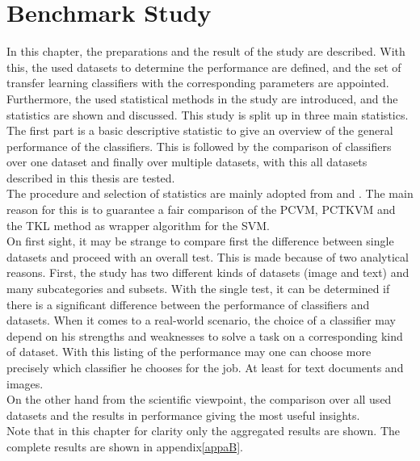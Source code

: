 \chapter{Benchmark Study}\label{EmChap}
In this chapter, the preparations and the result of the study are described.
With this, the used datasets to determine the performance are defined, and the set of transfer learning classifiers with the corresponding parameters are appointed.\\
Furthermore, the used statistical methods in the study are introduced, and the statistics are shown and discussed.
This study is split up in three main statistics.
The first part is a basic descriptive statistic to give an overview of the general performance of the classifiers.
This is followed by the comparison of classifiers over one dataset and finally over multiple datasets, with this all datasets described in this thesis are tested.\\
The procedure and selection of statistics are mainly adopted from \cite{Chen.2009} and \cite{Long.2015}.
The main reason for this is to guarantee a fair comparison of the \acs{PCVM}, \acs{PCTKVM} and the \acs{TKL} method as wrapper algorithm for the \acs{SVM}.\\
On first sight, it may be strange to compare first the difference between single datasets and proceed with an overall test.
This is made because of two analytical reasons. First, the study has two different kinds of datasets (image and text) and many subcategories and subsets.
With the single test, it can be determined if there is a significant difference between the performance of classifiers and datasets.
When it comes to a real-world scenario, the choice of a classifier may depend on his strengths and weaknesses to solve a task on a corresponding kind of dataset.
With this listing of the performance may one can choose more precisely which classifier he chooses for the job. At least for text documents and images.\\
On the other hand from the scientific viewpoint, the comparison over all used datasets and the results in performance giving the most useful insights.\\
Note that in this chapter for clarity only the aggregated results are shown. The complete results are shown in appendix\ref{appaB}.\\

